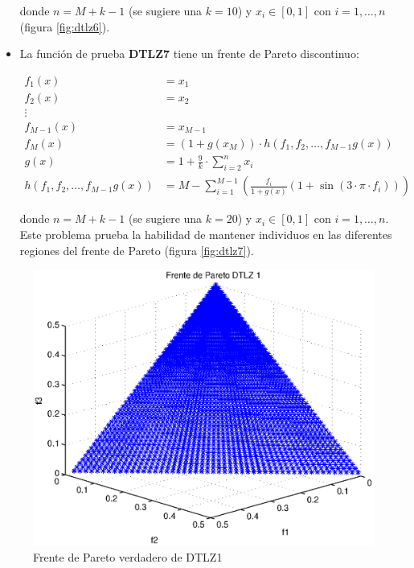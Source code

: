 \begin{itemize}
donde $n=M+k-1$ (se sugiere una $k=10$) y $x_i\in[0,1]$ con $i=1,\ldots,n$ (figura \ref{fig:dtlz6}).

\item La funci\'on de prueba \textbf{DTLZ7} tiene un frente de Pareto discontinuo:

\begin{align*}
f_1(x)&=x_1 \\
f_2(x)&=x_2\\
\vdots&\\
f_{M-1}(x)&=x_{M-1}\\
f_{M}(x)&=(1+g(x_M))\cdot h(f_1,f_2,\dots,f_{M-1}g(x))\\
g(x)&=1+\frac{9}{k}\cdot\sum_{i=2}^nx_i\\
h(f_1,f_2,\dots,f_{M-1}g(x))&=M-\sum_{i=1}^{M-1}(\frac{f_i}{1+g(x)}(1+\sin{(3\cdot\pi\cdot f_i)}))
\end{align*}

donde $n=M+k-1$ (se sugiere una $k=20$) y $x_i\in[0,1]$ con $i=1,\ldots,n$. Este problema prueba la habilidad de mantener 
individuos en las diferentes regiones del frente de Pareto (figura \ref{fig:dtlz7}).

\end{itemize}


\begin{figure}
    \centering
    \includegraphics[scale=0.7]{ApendiceA/paretoDTLZ1.eps}
    \caption{Frente de Pareto verdadero de DTLZ1}
    \label{fig:dtlz1}
\end{figure}

